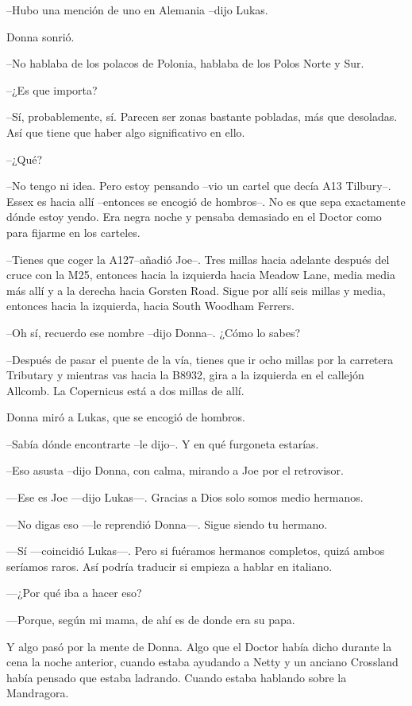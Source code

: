 --Hubo una mención de uno en Alemania --dijo Lukas.

Donna sonrió.

--No hablaba de los polacos de Polonia, hablaba de los Polos Norte y
Sur.

--¿Es que importa?

--Sí, probablemente, sí. Parecen ser zonas bastante pobladas, más que
desoladas. Así que tiene que haber algo significativo en ello.

--¿Qué?

--No tengo ni idea. Pero estoy pensando --vio un cartel que decía A13
Tilbury--. Essex es hacia allí --entonces se encogió de hombros--. No es
que sepa exactamente dónde estoy yendo. Era negra noche y pensaba
demasiado en el Doctor como para fijarme en los carteles.

--Tienes que coger la A127--añadió Joe--. Tres millas hacia adelante
después del cruce con la M25, entonces hacia la izquierda hacia Meadow
Lane, media media más allí y a la derecha hacia Gorsten Road. Sigue por
allí seis millas y media, entonces hacia la izquierda, hacia South
Woodham Ferrers.

--Oh sí, recuerdo ese nombre --dijo Donna--. ¿Cómo lo sabes?

--Después de pasar el puente de la vía, tienes que ir ocho millas por la
carretera Tributary y mientras vas hacia la B8932, gira a la izquierda
en el callejón Allcomb. La Copernicus está a dos millas de allí.

Donna miró a Lukas, que se encogió de hombros.

--Sabía dónde encontrarte --le dijo--. Y en qué furgoneta estarías.

--Eso asusta --dijo Donna, con calma, mirando a Joe por el retrovisor.


---Ese es Joe ---dijo Lukas---. Gracias a Dios solo somos medio
hermanos.

---No digas eso ---le reprendió Donna---. Sigue siendo tu hermano.

---Sí ---coincidió Lukas---. Pero si fuéramos hermanos completos, quizá
ambos seríamos raros. Así podría traducir si empieza a hablar en
italiano.

---¿Por qué iba a hacer eso?

---Porque, según mi mama, de ahí es de donde era su papa.

Y algo pasó por la mente de Donna. Algo que el Doctor había dicho
durante la cena la noche anterior, cuando estaba ayudando a Netty y un
anciano Crossland había pensado que estaba ladrando. Cuando estaba
hablando sobre la Mandragora.


